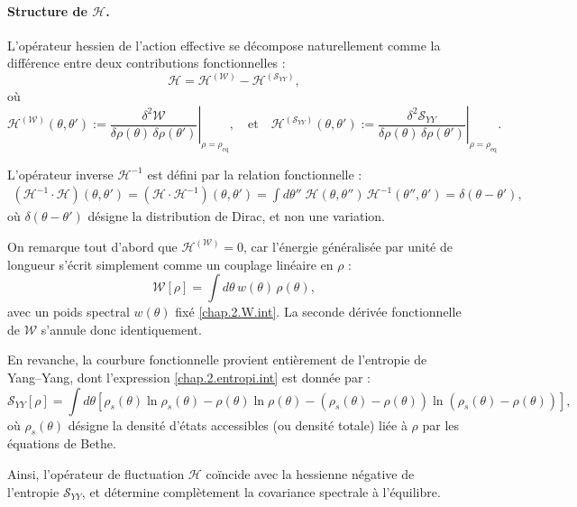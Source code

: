 \paragraph{Structure de \(\mathcal{H}\).}

L’opérateur hessien de l’action effective se décompose naturellement comme la différence entre deux contributions fonctionnelles :
\[
\mathcal{H} = \mathcal{H}^{(\mathcal{W})} - \mathcal{H}^{(\mathcal{S}_{YY})},
\]
où
\[
\mathcal{H}^{(\mathcal{W})}(\theta,\theta') := \left. \frac{\delta^2 \mathcal{W}}{\delta \rho(\theta)\, \delta \rho(\theta')} \right|_{\rho = \rho_{\mathrm{eq}}}, 
\quad \text{et} \quad 
\mathcal{H}^{(\mathcal{S}_{YY})}(\theta,\theta') := \left. \frac{\delta^2 \mathcal{S}_{YY}}{\delta \rho(\theta)\, \delta \rho(\theta')} \right|_{\rho = \rho_{\mathrm{eq}}}.
\]

L’opérateur inverse \(\mathcal{H}^{-1}\) est défini par la relation fonctionnelle :
\begin{eqnarray}
	(\mathcal{H}^{-1} \cdot \mathcal{H})(\theta, \theta') = (\mathcal{H} \cdot \mathcal{H}^{-1})(\theta, \theta') = \int d\theta'' \; \mathcal{H}(\theta, \theta'')\, \mathcal{H}^{-1}(\theta'', \theta') = \delta(\theta - \theta'),
	\label{chap:fluctu:eq:hessienner.prod.inv} 	
\end{eqnarray}
où \(\delta(\theta - \theta')\) désigne la distribution de Dirac, et non une variation.

\medskip

On remarque tout d’abord que \(\mathcal{H}^{(\mathcal{W})} = 0\), car l’énergie généralisée par unité de longueur s’écrit simplement comme un couplage linéaire en \(\rho\) :
\[
\mathcal{W}[\rho] = \int d\theta \, w(\theta)\, \rho(\theta),
\]
avec un poids spectral \(w(\theta)\) fixé \eqref{chap.2.W.int}. La seconde dérivée fonctionnelle de \(\mathcal{W}\) s’annule donc identiquement.

En revanche, la courbure fonctionnelle provient entièrement de l'entropie de Yang–Yang, dont l’expression \eqref{chap.2.entropi.int} est donnée par :
\[
\mathcal{S}_{YY}[\rho] = \int d\theta \left[
\rho_s(\theta) \ln \rho_s(\theta) - \rho(\theta) \ln \rho(\theta) - (\rho_s(\theta) - \rho(\theta)) \ln(\rho_s(\theta) - \rho(\theta))
\right],
\]
où \(\rho_s(\theta)\) désigne la densité d’états accessibles (ou densité totale) liée à \(\rho\) par les équations de Bethe.

Ainsi, l’opérateur de fluctuation \(\mathcal{H}\) coïncide avec la hessienne négative de l'entropie \(\mathcal{S}_{YY}\), et détermine complètement la covariance spectrale à l’équilibre.



